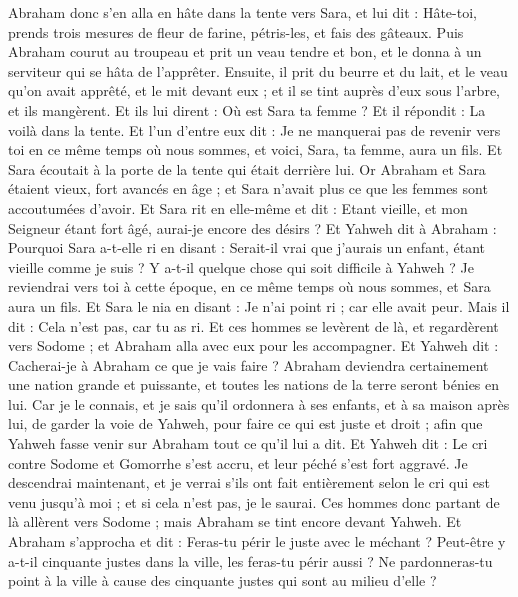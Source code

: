 \begin{multicols}{2}
Abraham donc s'en alla en hâte dans la tente vers Sara, et lui dit : Hâte-toi, prends trois mesures de fleur de farine, pétris-les, et fais des gâteaux.
Puis Abraham courut au troupeau et prit un veau tendre et bon, et le donna à un serviteur qui se hâta de l'apprêter.
Ensuite, il prit du beurre et du lait, et le veau qu'on avait apprêté, et le mit devant eux ; et il se tint auprès d'eux sous l'arbre, et ils mangèrent.
Et ils lui dirent : Où est Sara ta femme ? Et il répondit : La voilà dans la tente.
Et l'un d'entre eux dit : Je ne manquerai pas de revenir vers toi en ce même temps où nous sommes, et voici, Sara, ta femme, aura un fils. Et Sara écoutait à la porte de la tente qui était derrière lui.
Or Abraham et Sara étaient vieux, fort avancés en âge ; et Sara n'avait plus ce que les femmes sont accoutumées d'avoir.
Et Sara rit en elle-même et dit : Etant vieille, et mon Seigneur étant fort âgé, aurai-je encore des désirs ?
Et Yahweh dit à Abraham : Pourquoi Sara a-t-elle ri en disant : Serait-il vrai que j'aurais un enfant, étant vieille comme je suis ?
Y a-t-il quelque chose qui soit difficile à Yahweh ? Je reviendrai vers toi à cette époque, en ce même temps où nous sommes, et Sara aura un fils.
Et Sara le nia en disant : Je n'ai point ri ; car elle avait peur. Mais il dit : Cela n'est pas, car tu as ri.
Et ces hommes se levèrent de là, et regardèrent vers Sodome ; et Abraham alla  avec eux pour les accompagner.
Et Yahweh dit : Cacherai-je à Abraham ce que je vais faire ?
Abraham deviendra certainement une nation grande et puissante, et toutes les nations de la terre seront bénies en lui.
Car je le connais, et je sais qu'il ordonnera à ses enfants, et à sa maison après lui, de garder la voie de Yahweh, pour faire ce qui est juste et droit ; afin que Yahweh fasse venir sur Abraham tout ce qu'il lui a dit.
Et Yahweh dit : Le cri contre Sodome et Gomorrhe s’est accru, et leur péché s’est fort aggravé.
Je descendrai maintenant, et je verrai s'ils ont fait entièrement selon le cri qui est venu jusqu'à moi ; et si cela n'est pas, je le saurai.
Ces hommes donc partant de là allèrent vers Sodome ; mais Abraham se tint encore devant Yahweh.
Et Abraham s'approcha et dit : Feras-tu périr le juste avec le méchant ?
Peut-être y a-t-il cinquante justes dans la ville, les feras-tu périr aussi ? Ne pardonneras-tu point à la ville à cause des cinquante justes qui sont au milieu d’elle ?

\end{multicols}
